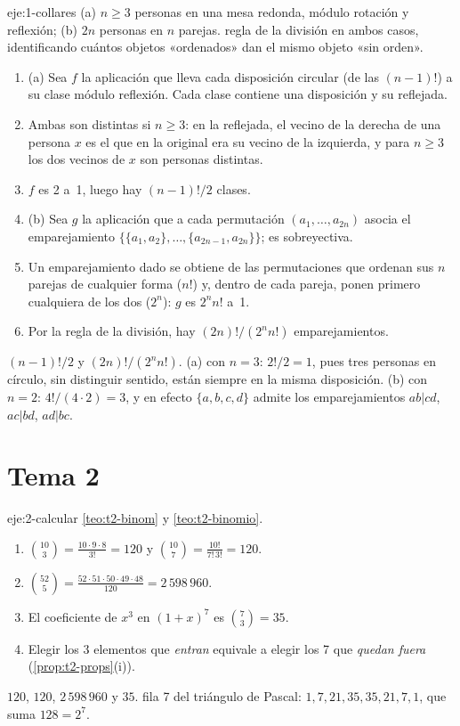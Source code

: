 \begin{solucion}{eje:1-collares}
\datos (a) $n\ge3$ personas en una mesa redonda, módulo rotación y reflexión; (b) $2n$ personas en $n$ parejas.
\planteamiento regla de la división en ambos casos, identificando cuántos objetos «ordenados» dan el mismo objeto «sin orden».
\pasos
\begin{enumerate}[label=\arabic*.]
  \item (a) Sea $f$ la aplicación que lleva cada disposición circular (de las $(n-1)!$) a su clase módulo reflexión. Cada clase contiene una disposición y su reflejada.
  \item Ambas son distintas si $n\ge3$: en la reflejada, el vecino de la derecha de una persona $x$ es el que en la original era su vecino de la izquierda, y para $n\ge3$ los dos vecinos de $x$ son personas distintas.
  \item $f$ es 2 a~1, luego hay $(n-1)!/2$ clases.
  \item (b) Sea $g$ la aplicación que a cada permutación $(a_1,\dots,a_{2n})$ asocia el emparejamiento $\{\{a_1,a_2\},\dots,\{a_{2n-1},a_{2n}\}\}$; es sobreyectiva.
  \item Un emparejamiento dado se obtiene de las permutaciones que ordenan sus $n$ parejas de cualquier forma ($n!$) y, dentro de cada pareja, ponen primero cualquiera de los dos ($2^{n}$): $g$ es $2^{n}n!$ a~1.
  \item Por la regla de la división, hay $(2n)!/(2^{n}n!)$ emparejamientos.
\end{enumerate}
\resultado $(n-1)!/2$ y $(2n)!/(2^{n}n!)$.
\comprobacion (a) con $n=3$: $2!/2=1$, pues tres personas en círculo, sin distinguir sentido, están siempre en la misma disposición. (b) con $n=2$: $4!/(4\cdot2)=3$, y en efecto $\{a,b,c,d\}$ admite los emparejamientos $ab|cd$, $ac|bd$, $ad|bc$.
\end{solucion}

\section{Tema 2}

\begin{solucion}{eje:2-calcular}
\planteamiento \cref{teo:t2-binom} y \cref{teo:t2-binomio}.
\pasos
\begin{enumerate}[label=\arabic*.]
  \item $\binom{10}{3}=\frac{10\cdot9\cdot8}{3!}=120$ y $\binom{10}{7}=\frac{10!}{7!\,3!}=120$.
  \item $\binom{52}{5}=\frac{52\cdot51\cdot50\cdot49\cdot48}{120}=2\,598\,960$.
  \item El coeficiente de $x^{3}$ en $(1+x)^{7}$ es $\binom73=35$.
  \item Elegir los 3 elementos que \emph{entran} equivale a elegir los 7 que \emph{quedan fuera} (\cref{prop:t2-props}(i)).
\end{enumerate}
\resultado $120$, $120$, $2\,598\,960$ y $35$.
\comprobacion fila 7 del triángulo de Pascal: $1,7,21,35,35,21,7,1$, que suma $128=2^{7}$.
\end{solucion}

